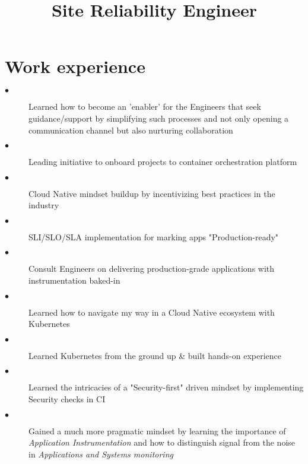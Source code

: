 \documentclass[11pt,a4paper,Hack,english]{moderncv}        %
\title{Site Reliability Engineer}%
\begin{document}
\makecvtitle
\section{Work experience}
{
	\begin{description}
		\item[$\bullet$] Learned how to become an 'enabler' for the Engineers that seek guidance/support by
                     simplifying such processes and not only opening a communication channel but also
                     nurturing collaboration
		\item[$\bullet$] Leading initiative to onboard projects to container orchestration platform
		\item[$\bullet$] Cloud Native mindset buildup by incentivizing best practices in the industry
		\item[$\bullet$] SLI/SLO/SLA implementation for marking apps "Production-ready"
		\item[$\bullet$] Consult Engineers on delivering production-grade applications with instrumentation baked-in
	\end{description}
}

{
	\begin{description}
		\item[$\bullet$] Learned how to navigate my way in a Cloud Native ecosystem with Kubernetes
    \item[$\bullet$] Learned Kubernetes from the ground up & built hands-on experience
    \item[$\bullet$] Learned the intricacies of a "Security-first" driven mindset by implementing Security checks in CI
    \item[$\bullet$] Gained a much more pragmatic mindset by learning the importance of \textit{Application Instrumentation}
                     and how to distinguish signal from the noise in \textit{Applications and Systems monitoring}
	\end{description}
}
\end{document}

